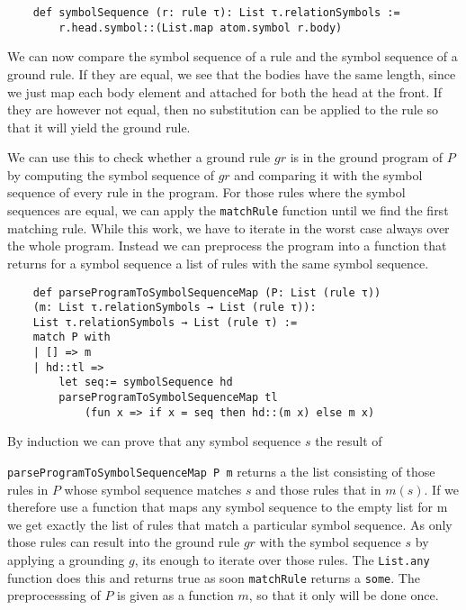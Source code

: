 \begin{lstlisting}
    def symbolSequence (r: rule τ): List τ.relationSymbols := 
        r.head.symbol::(List.map atom.symbol r.body)

\end{lstlisting}

We can now compare the symbol sequence of a rule and the symbol sequence of a ground rule. If they are equal, we see that the bodies have the same length, since we just map each body element and attached for both the head at the front. If they are however not equal, then no substitution can be applied to the rule so that it will yield the ground rule.

We can use this to check whether a ground rule $gr$ is in the ground program of $P$ by computing the symbol sequence of $gr$ and comparing it with the symbol sequence of every rule in the program. For those rules where the symbol sequences are equal, we can apply the \texttt{matchRule} function until we find the first matching rule. While this work, we have to iterate in the worst case always over the whole program. Instead we can preprocess the program into a function that returns for a symbol sequence a list of rules with the same symbol sequence.

\begin{lstlisting}
    def parseProgramToSymbolSequenceMap (P: List (rule τ)) 
    (m: List τ.relationSymbols → List (rule τ)): 
    List τ.relationSymbols → List (rule τ) :=
    match P with
    | [] => m
    | hd::tl =>
        let seq:= symbolSequence hd
        parseProgramToSymbolSequenceMap tl 
            (fun x => if x = seq then hd::(m x) else m x)
\end{lstlisting}

By induction we can prove that any symbol sequence $s$ the result of 

\texttt{parseProgramToSymbolSequenceMap P m} returns a the list consisting of those rules in $P$ whose symbol sequence matches $s$ and those rules that in $m (s)$. If we therefore use a function that maps any symbol sequence to the empty list for m we get exactly the list of rules that match a particular symbol sequence. As only those rules can result into the ground rule $gr$ with the symbol sequence $s$ by applying a grounding $g$, its enough to iterate over those rules. The \texttt{List.any} function does this and returns true as soon \texttt{matchRule} returns a \texttt{some}. The preprocesssing of $P$ is given as a function $m$, so that it only will be done once.  

